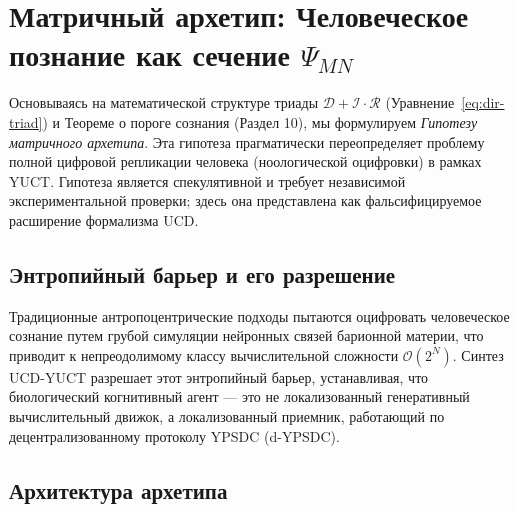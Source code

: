 \documentclass[12pt,a4paper]{article}
\begin{document}
	\section{Матричный архетип: Человеческое познание как сечение \(\Psi_{MN}\)}
	\label{sec:matrix}
	
	Основываясь на математической структуре триады \(\mathcal{D}+\mathcal{I}\cdot\mathcal{R}\) (Уравнение~\ref{eq:dir-triad}) и Теореме о пороге сознания (Раздел 10), мы формулируем \textit{Гипотезу матричного архетипа}. Эта гипотеза прагматически переопределяет проблему полной цифровой репликации человека (ноологической оцифровки) в рамках YUCT. Гипотеза является спекулятивной и требует независимой экспериментальной проверки; здесь она представлена как фальсифицируемое расширение формализма UCD.
	
	\subsection{Энтропийный барьер и его разрешение}
	
	Традиционные антропоцентрические подходы пытаются оцифровать человеческое сознание путем грубой симуляции нейронных связей барионной материи, что приводит к непреодолимому классу вычислительной сложности \(\mathcal{O}(2^N)\). Синтез UCD-YUCT разрешает этот энтропийный барьер, устанавливая, что биологический когнитивный агент — это не локализованный генеративный вычислительный движок, а локализованный приемник, работающий по децентрализованному протоколу YPSDC (d-YPSDC).
	
	\subsection{Архитектура архетипа}
	
\end{document}
